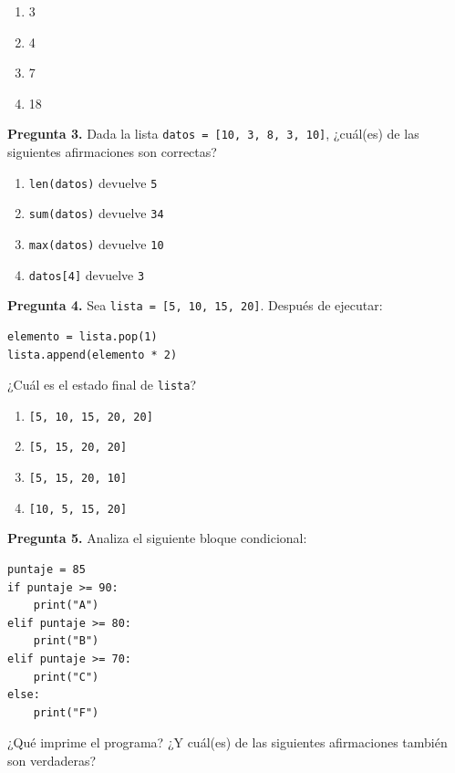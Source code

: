 \documentclass[12pt,a4paper]{article}
\begin{document}
\begin{enumerate}[label=\alph*), leftmargin=2em, itemsep=4pt]
  \item[$\square$ a)] 3
  \item[$\square$ b)] 4
  \item[$\square$ c)] 7
  \item[$\square$ d)] 18
\end{enumerate}

\bigskip

\noindent\textbf{Pregunta 3.} Dada la lista \lstinline|datos = [10, 3, 8, 3, 10]|, ¿cuál(es) de las siguientes afirmaciones son correctas?

\begin{enumerate}[label=\alph*), leftmargin=2em, itemsep=4pt]
  \item[$\square$ a)] \lstinline|len(datos)| devuelve \texttt{5}
  \item[$\square$ b)] \lstinline|sum(datos)| devuelve \texttt{34}
  \item[$\square$ c)] \lstinline|max(datos)| devuelve \texttt{10}
  \item[$\square$ d)] \lstinline|datos[4]| devuelve \texttt{3}
\end{enumerate}

\bigskip

\noindent\textbf{Pregunta 4.} Sea \lstinline|lista = [5, 10, 15, 20]|. Después de ejecutar:
\begin{lstlisting}[style=PythonStyle]
elemento = lista.pop(1)
lista.append(elemento * 2)
\end{lstlisting}
¿Cuál es el estado final de \lstinline|lista|?

\begin{enumerate}[label=\alph*), leftmargin=2em, itemsep=4pt]
  \item[$\square$ a)] \lstinline|[5, 10, 15, 20, 20]|
  \item[$\square$ b)] \lstinline|[5, 15, 20, 20]|
  \item[$\square$ c)] \lstinline|[5, 15, 20, 10]|
  \item[$\square$ d)] \lstinline|[10, 5, 15, 20]|
\end{enumerate}

\bigskip

\noindent\textbf{Pregunta 5.} Analiza el siguiente bloque condicional:
\begin{lstlisting}[style=PythonStyle]
puntaje = 85
if puntaje >= 90:
    print("A")
elif puntaje >= 80:
    print("B")
elif puntaje >= 70:
    print("C")
else:
    print("F")
\end{lstlisting}
¿Qué imprime el programa? ¿Y cuál(es) de las siguientes afirmaciones también son verdaderas?
\end{document}
